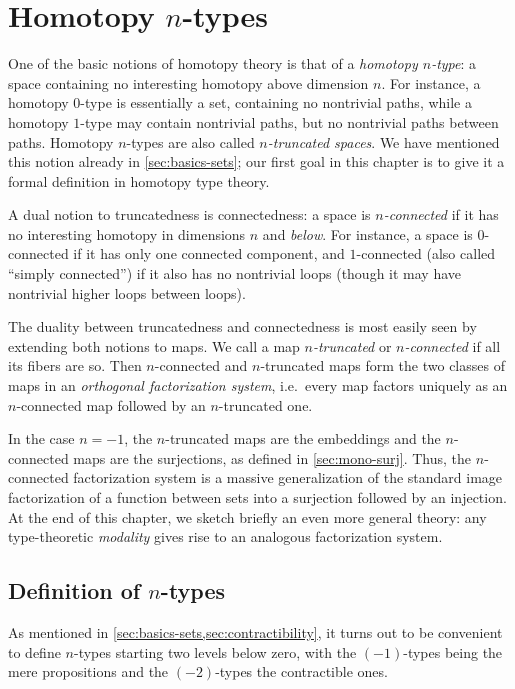 \chapter{Homotopy \texorpdfstring{$n$}{n}-types}
\label{cha:hlevels}

One of the basic notions of homotopy theory is that of a \emph{homotopy $n$-type}: a space containing no interesting homotopy above dimension $n$.
For instance, a homotopy $0$-type is essentially a set, containing no nontrivial paths, while a homotopy $1$-type may contain nontrivial paths, but no nontrivial paths between paths.
Homotopy $n$-types are also called \emph{$n$-truncated spaces}.
We have mentioned this notion already in \autoref{sec:basics-sets}; our first goal in this chapter is to give it a formal definition in homotopy type theory.

A dual notion to truncatedness is connectedness: a space is \emph{$n$-connected} if it has no interesting homotopy in dimensions $n$ and \emph{below}.
For instance, a space is $0$-connected if it has only one connected component, and $1$-connected (also called ``simply connected'') if it also has no nontrivial loops (though it may have nontrivial higher loops between loops).

The duality between truncatedness and connectedness is most easily seen by extending both notions to maps.
We call a map \emph{$n$-truncated} or \emph{$n$-connected} if all its fibers are so.
Then $n$-connected and $n$-truncated maps form the two classes of maps in an \emph{orthogonal factorization system}, i.e.\ every map factors uniquely as an $n$-connected map followed by an $n$-truncated one.

In the case $n={-1}$, the $n$-truncated maps are the embeddings and the $n$-connected maps are the surjections, as defined in \autoref{sec:mono-surj}.
Thus, the $n$-connected factorization system is a massive generalization of the standard image factorization of a function between sets into a surjection followed by an injection.
At the end of this chapter, we sketch briefly an even more general theory: any type-theoretic \emph{modality} gives rise to an analogous factorization system.


\section{Definition of \texorpdfstring{$n$}{n}-types}
\label{sec:n-types}

As mentioned in \autoref{sec:basics-sets,sec:contractibility}, it turns out to be convenient to define $n$-types starting two levels below zero, with the $(-1)$-types being the mere propositions and the $(-2)$-types the contractible ones.

